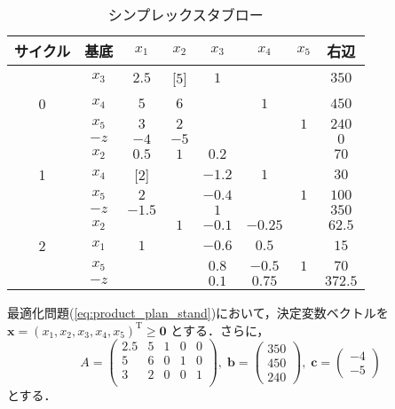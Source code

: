 \documentclass{jsreport}
\begin{document}
\begin{table}[htb]
  \centering
    \caption{シンプレックスタブロー}
    \begin{tabular}{c|c|ccccc|c}
    サイクル & 基底   & $x_1$ & $x_2$ & $x_3$ & $x_4$ & $x_5$ & 右辺  \\ \hline
            & $x_3$ & $2.5$ & [$5$] & $1$   &       &       & $350$ \\
       0    & $x_4$ & $5$   & $6$   &       & $1$   &       & $450$ \\
            & $x_5$ & $3$   & $2$   &       &       &  $1$  & $240$ \\ \cline{2-8}
            & $-z$  & $-4$  & $-5$  &       &       &       & $0$   \\ \hline

            & $x_2$ & $0.5$ & $1$   & $0.2$ &       &       & $70$  \\
       1    & $x_4$ & [$2$] &       & $-1.2$& $1$   &       & $30$  \\
            & $x_5$ & $2$   &       & $-0.4$&       &  $1$  & $100$ \\ \cline{2-8}
            & $-z$  & $-1.5$&       & $1$   &       &       & $350$ \\ \hline

            & $x_2$ &       & $1$   & $-0.1$&$-0.25$&       & $62.5$\\
       2    & $x_1$ & $1$   &       & $-0.6$& $0.5$ &       & $15$  \\
            & $x_5$ &       &       & $0.8$ &$-0.5$ &  $1$  & $70$  \\ \cline{2-8}
            & $-z$  &       &       & $0.1$ & $0.75$&       &$372.5$\\ \hline
    \end{tabular}
    \label{tab:product_plan_sol}
\end{table}

最適化問題(\ref{eq:product_plan_stand})において，決定変数ベクトルを$\bm{x} = (x_1, x_2, x_3, x_4, x_5)^{\mathrm{T}} \geq \bm{0}$
とする．さらに，
\begin{equation}
  A = \left(
  \begin{array}{ccccc}
    2.5 & 5 & 1 & 0 & 0 \\
    5   & 6 & 0 & 1 & 0 \\
    3   & 2 & 0 & 0 & 1 \\
  \end{array}
  \right), \; \bm{b} = \left(
  \begin{array}{c}
    350 \\
    450 \\
    240
  \end{array}
  \right), \; \bm{c} = \left(
  \begin{array}{c}
    -4 \\
    -5
  \end{array}
  \right) \nonumber
\end{equation}
とする．
\end{document}
